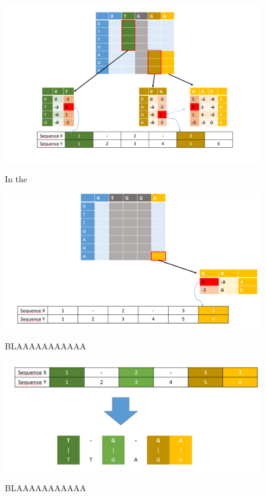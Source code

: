 \documentclass[%
   10pt,              %
   nenglish,           %
   a4paper,           %
   DIV11,             %
]{scrartcl}%
\begin{document}
  \begin{figure}[h]
   	\includegraphics[scale=0.25]{img/Hirschberg_Step2.png}
   	\label{Step2}
   	\caption{In the}
  \end{figure}
  \begin{figure}[h]
    \includegraphics[scale=0.25]{img/Hirschberg_Step3.png}
	\label{Step3}
	\caption{BLAAAAAAAAAAA}
  \end{figure}
      
  \begin{figure}[h]
   \includegraphics[scale=0.25]{img/Hirschberg_Step4.png}
   \label{Step4}
   \caption{BLAAAAAAAAAAA}
   \end{figure}
\end{document}
